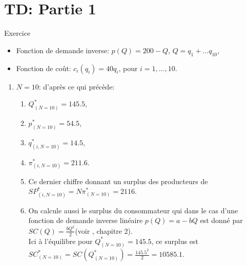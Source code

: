 \section{TD: Partie 1}
\frame{\sectionpage}
\begin{frame}[allowframebreaks]{Exercice}
    \begin{itemize}
        \item Fonction de demande inverse: $p(Q) = 200-Q$, $Q=q_1+\ldots q_{10}$, 
        \item Fonction de coût: $c_i(q_i) = 40q_i$, pour $i=1, \ldots, 10$.
    \end{itemize}
    \begin{enumerate}
        \item $N = 10$: d'après ce qui précède:
        \begin{enumerate}[$\star$]
        \item $Q^*_{(N=10)} = 145.5$, 
        \item $p^*_{(N=10)}=54.5$, 
        \item $q_{(i, N=10)}^* = 14.5$,  
        \item $\pi_{(i, N=10)}^*= 211.6$. 
        \item Ce dernier chiffre donnant un surplus des producteurs de $SP_{(i, N=10)}^* = N\pi_{(N=10)}^*=2116$.
        \item  On calcule aussi le surplus du consommateur qui dans le cas d'une fonction de demande inverse 
        linéaire $p(Q) = a-bQ$ est donné par $SC(Q) = \frac{bQ^2}{2}$(voir \citet{belleflamme_peitz_2015}, chapitre 2).\\ Ici à l'équilibre 
        pour $Q^*_{(N=10)} = 145.5$,
         ce surplus est $SC_{(N=10)}^* = SC(Q_{(N=10)}^*) = \frac{145.5^2}{2}  = 10585.1$.
        \end{enumerate}
        

\end{enumerate}
\end{frame}

